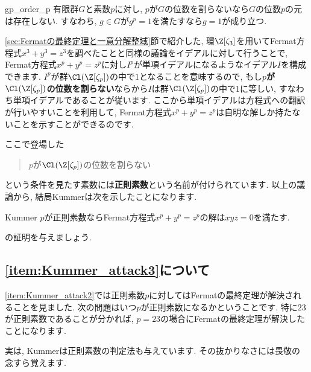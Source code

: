 \documentclass[11pt,b5paper,oneside,titlepage,lualatex]{ltjsreport}
\begin{document}
\begin{lem}{}{gp_order_p}
	有限群$ G $と素数$ p $に対し, $ p $が$ G $の位数を割らないなら$ G $の位数$ p $の元は存在しない. 
	すなわち, $ g \in G $が$ g^p = 1 $を満たすなら$ g = 1 $が成り立つ. 
\end{lem}

\ref{sec:Fermatの最終定理と一意分解整域}節で紹介した, 環$ \Z[\zeta_3] $を用いてFermat方程式$ x^3 + y^3 = z^3 $を調べたことと同様の議論をイデアルに対して行うことで, Fermat方程式$ x^p + y^p = z^p $に対し$ I^p $が単項イデアルになるようなイデアル$ I $を構成できます. 
$ I^p $が群$ \Cl(\Z[\zeta_p]) $の中で$ 1 $となることを意味するので, もし\textbf{$ p $が$ \Cl(\Z[\zeta_p]) $の位数を割らない}ならから$ I $は群$ \Cl(\Z[\zeta_p]) $の中で$ 1 $に等しい, すなわち単項イデアルであることが従います. 
ここから単項イデアルは方程式への翻訳が行いやすいことを利用して, Fermat方程式$ x^p + y^p = z^p $は自明な解しか持たないことを示すことができるのです. 

ここで登場した
\begin{quote}
	\centering
	$ p $が$ \Cl(\Z[\zeta_p]) $の位数を割らない
\end{quote}
という条件を見たす素数には\textbf{正則素数}という名前が付けられています. 
以上の議論から, 結局Kummerは次を示したことになります. 

\begin{thm}{Kummer}{}
	$ p $が正則素数ならFermat方程式$ x^p + y^p = z^p $の解は$ xyz = 0 $を満たす. 
\end{thm}


\begin{exc}{}{}
	の証明を与えましょう. 
\end{exc}


\subsection{\ref{item:Kummer_attack3}について}


\ref{item:Kummer_attack2}では正則素数$ p $に対してはFermatの最終定理が解決されることを見ました. 
次の問題はいつ$ p $が正則素数になるかということです. 
特に$ 23 $が正則素数であることが分かれば, $ p=23 $の場合にFermatの最終定理が解決したことになります. 

実は, Kummerは正則素数の判定法も与えています. 
その抜かりなさには畏敬の念すら覚えます. 
\end{document}
